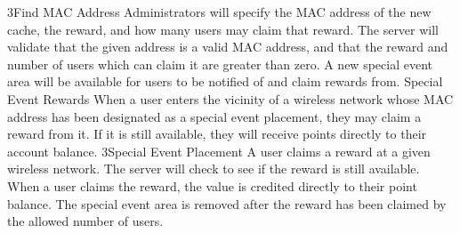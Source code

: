 			{3}{Find MAC Address}
			{Administrators will specify the MAC address of the new cache, the reward, and how many users may claim that reward.}
			{The server will validate that the given address is a valid MAC address, and that the reward and number of users which can claim it are greater than zero.}
			{A new special event area will be available for users to be notified of and claim rewards from.}
		\funcreq
			{Special Event Rewards}
			{When a user enters the vicinity of a wireless network whose MAC address has been designated as a special event placement, they may claim a reward from it. If it is still available, they will receive points directly to their account balance.}
			{3}{Special Event Placement}
			{A user claims a reward at a given wireless network.}
			{The server will check to see if the reward is still available.}
			{When a user claims the reward, the value is credited directly to their point balance. The special event area is removed after the reward has been claimed by the allowed number of users.}
